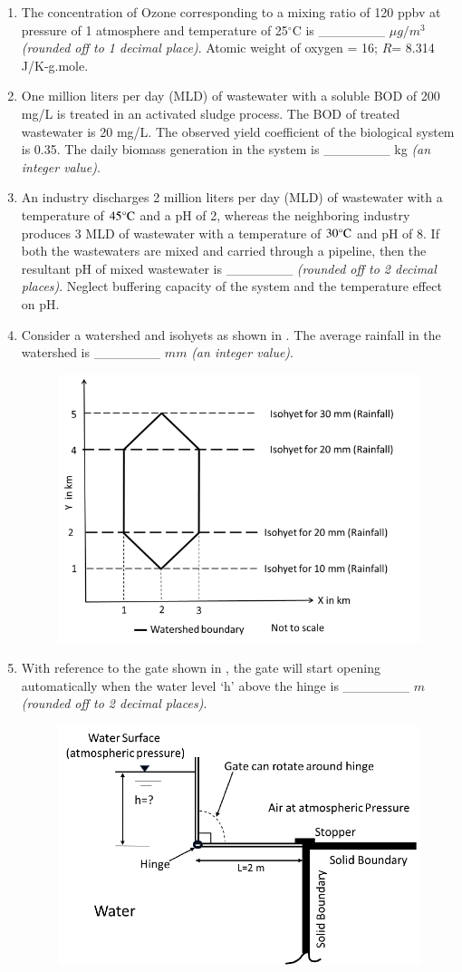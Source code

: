 \documentclass[journal]{IEEEtran}
\begin{document}
\begin{enumerate}
\item The concentration of Ozone corresponding to a mixing ratio of 120 ppbv at pressure of 1 atmosphere and temperature of 25$^{\circ}$C is \_\_\_\_\_\_\_ $\mu g/m^3$ \textit{(rounded off to 1 decimal place)}. Atomic weight of oxygen = 16; $R$= 8.314 J/K-g.mole.
\hfill{}

\item One million liters per day (MLD) of wastewater with a soluble BOD of 200 mg/L is treated in an activated sludge process. The BOD of treated wastewater is 20 mg/L. The observed yield coefficient of the biological system is 0.35. The daily biomass generation in the system is \_\_\_\_\_\_\_ kg \textit{(an integer value)}.
\hfill{}

\item An industry discharges 2 million liters per day (MLD) of wastewater with a temperature of $45\celsius$ and a pH of 2, whereas the neighboring industry produces 3 MLD of wastewater with a temperature of $30\celsius$ and pH of 8. If both the wastewaters are mixed and carried through a pipeline, then the resultant pH of mixed wastewater is \_\_\_\_\_\_\_ \textit{(rounded off to 2 decimal places)}. Neglect buffering capacity of the system and the temperature effect on pH.
\hfill{}

\item Consider a watershed and isohyets as shown in . The average rainfall in the watershed is \_\_\_\_\_\_\_ $mm$ \textit{(an integer value)}.
\hfill{}
\begin{figure}[H]
    \centering
    \includegraphics[width=0.5\columnwidth]{figs/fig9.png}
    \caption{}
    \label{fig9}
\end{figure}

\item With reference to the gate shown in , the gate will start opening automatically when the water level `h' above the hinge is \_\_\_\_\_\_\_ $m$ \textit{(rounded off to 2 decimal places)}.
\hfill{}
\begin{figure}[H]
    \centering
    \includegraphics[width=0.5\columnwidth]{figs/fig10.png}
    \caption{}
    \label{fig10}
\end{figure}


\end{enumerate}
\end{document}
